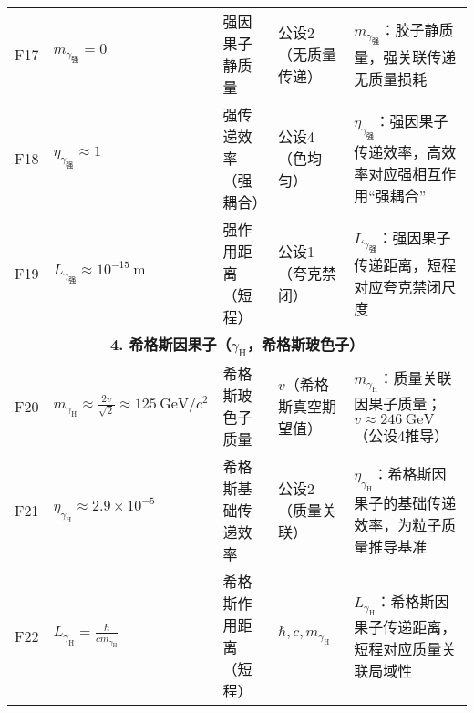 \documentclass{article}
\begin{document}
\begin{table}[h!]
{\begin{tabular}{l l l l l}
F17 & \( m_{\gamma_{\text{强}}} = 0 \) & 强因果子静质量 & 公设2（无质量传递） & \( m_{\gamma_{\text{强}}} \)：胶子静质量，强关联传递无质量损耗 \\
F18 & \( \eta_{\gamma_{\text{强}}} ≈ 1 \) & 强传递效率（强耦合） & 公设4（色均匀） & \( \eta_{\gamma_{\text{强}}} \)：强因果子传递效率，高效率对应强相互作用“强耦合” \\
F19 & \( L_{\gamma_{\text{强}}} ≈ 10^{-15}\ \text{m} \) & 强作用距离（短程） & 公设1（夸克禁闭） & \( L_{\gamma_{\text{强}}} \)：强因果子传递距离，短程对应夸克禁闭尺度 \\
\midrule
\multicolumn{5}{c}{\textbf{4. 希格斯因果子（\(\gamma_{\text{H}}\)，希格斯玻色子）}} \\
F20 & \( m_{\gamma_{\text{H}}} ≈ \frac{2v}{\sqrt{2}} ≈ 125\ \text{GeV}/c^2 \) & 希格斯玻色子质量 & \( v \)（希格斯真空期望值） & \( m_{\gamma_{\text{H}}} \)：质量关联因果子质量；\( v≈246\ \text{GeV} \)（公设4推导） \\
F21 & \( \eta_{\gamma_{\text{H}}} ≈ 2.9×10^{-5} \) & 希格斯基础传递效率 & 公设2（质量关联） & \( \eta_{\gamma_{\text{H}}} \)：希格斯因果子的基础传递效率，为粒子质量推导基准 \\
F22 & \( L_{\gamma_{\text{H}}} = \frac{\hbar}{c m_{\gamma_{\text{H}}}} \) & 希格斯作用距离（短程） & \( \hbar, c, m_{\gamma_{\text{H}}} \) & \( L_{\gamma_{\text{H}}} \)：希格斯因果子传递距离，短程对应质量关联局域性 \\
\bottomrule
\end{tabular}%
}
\end{table}
\end{document}
